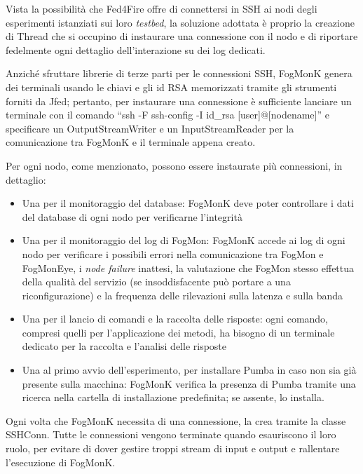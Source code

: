         Vista la possibilità che Fed4Fire offre di connettersi in SSH ai nodi degli esperimenti istanziati sui loro \textit{testbed}, la soluzione adottata è proprio la creazione di Thread che si occupino di instaurare una connessione con il nodo e di riportare fedelmente ogni dettaglio dell’interazione su dei log dedicati.
        
        Anziché sfruttare librerie di terze parti per le connessioni SSH, FogMonK genera dei terminali usando le chiavi e gli id RSA memorizzati tramite gli strumenti forniti da Jfed; pertanto, per instaurare una connessione è sufficiente lanciare un terminale con il comando “ssh -F ssh-config -I id\_rsa [user]@[nodename]” e specificare un OutputStreamWriter e un InputStreamReader per la comunicazione tra FogMonK e il terminale appena creato.
        
        Per ogni nodo, come menzionato, possono essere instaurate più connessioni, in dettaglio: 
        \begin{itemize}
            \item Una per il monitoraggio del database: 
            FogMonK deve poter controllare i dati del database di ogni nodo per verificarne l’integrità 
            
            \item Una per il monitoraggio del log di FogMon: 
            FogMonK accede ai log di ogni nodo per verificare i possibili errori nella comunicazione tra FogMon e FogMonEye, i \textit{node failure} inattesi, la valutazione che FogMon stesso effettua della qualità del servizio (se insoddisfacente può portare a una riconfigurazione) e la frequenza delle rilevazioni sulla latenza e sulla banda 
            
            \item Una per il lancio di comandi e la raccolta delle risposte: 
            ogni comando, compresi quelli per l'applicazione dei metodi, ha bisogno di un terminale dedicato per la raccolta e l’analisi delle risposte 
             
            \item Una al primo avvio dell’esperimento, per installare Pumba in caso non sia già presente sulla macchina: 
            FogMonK verifica la presenza di Pumba tramite una ricerca nella cartella di installazione predefinita; se assente, lo installa.
        \end{itemize}
        Ogni volta che FogMonK necessita di una connessione, la crea tramite la classe SSHConn. Tutte le connessioni vengono terminate quando esauriscono il loro ruolo, per evitare di dover gestire troppi stream di input e output e rallentare l'esecuzione di FogMonK.
